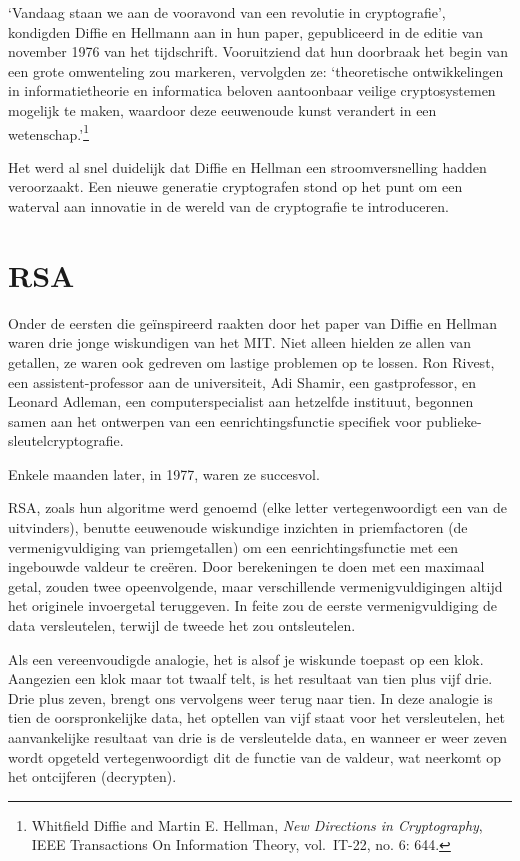 \documentclass[
  a5paper,
  smalldemyvopaper,11pt,twoside,onecolumn,openright,extrafontsizes,
hidelinks]{memoir}
\begin{document}
`Vandaag staan we aan de vooravond van een revolutie in cryptografie',
kondigden Diffie en Hellmann aan in hun paper, gepubliceerd in de editie
van november 1976 van het tijdschrift. Vooruitziend dat hun doorbraak
het begin van een grote omwenteling zou markeren, vervolgden ze:
`theoretische ontwikkelingen in informatietheorie en informatica beloven
aantoonbaar veilige cryptosystemen mogelijk te maken, waardoor deze
eeuwenoude kunst verandert in een wetenschap.'\footnote{\hspace{0pt}Whitfield
  Diffie and Martin E. Hellman, \emph{New Directions in Cryptography},
  IEEE Transactions On Information Theory, vol.~IT-22, no. 6: 644.}

Het werd al snel duidelijk dat Diffie en Hellman een stroomversnelling
hadden veroorzaakt. Een nieuwe generatie cryptografen stond op het punt
om een waterval aan innovatie in de wereld van de cryptografie te
introduceren.

\section{RSA}\label{rsa}

Onder de eersten die geïnspireerd raakten door het paper van Diffie en
Hellman waren drie jonge wiskundigen van het MIT. Niet alleen hielden ze
allen van getallen, ze waren ook gedreven om lastige problemen op te
lossen. Ron Rivest, een assistent-professor aan de universiteit, Adi
Shamir, een gastprofessor, en Leonard Adleman, een computerspecialist
aan hetzelfde instituut, begonnen samen aan het ontwerpen van een
eenrichtingsfunctie specifiek voor publieke-sleutelcryptografie.

Enkele maanden later, in 1977, waren ze succesvol.

RSA, zoals hun algoritme werd genoemd (elke letter vertegenwoordigt een
van de uitvinders), benutte eeuwenoude wiskundige inzichten in
priemfactoren (de vermenigvuldiging van priemgetallen) om een
eenrichtingsfunctie met een ingebouwde valdeur te creëren. Door
berekeningen te doen met een maximaal getal, zouden twee opeenvolgende,
maar verschillende vermenigvuldigingen altijd het originele invoergetal
teruggeven. In feite zou de eerste vermenigvuldiging de data
versleutelen, terwijl de tweede het zou ontsleutelen.

Als een vereenvoudigde analogie, het is alsof je wiskunde toepast op een
klok. Aangezien een klok maar tot twaalf telt, is het resultaat van tien
plus vijf drie. Drie plus zeven, brengt ons vervolgens weer terug naar
tien. In deze analogie is tien de oorspronkelijke data, het optellen van
vijf staat voor het versleutelen, het aanvankelijke resultaat van drie
is de versleutelde data, en wanneer er weer zeven wordt opgeteld
vertegenwoordigt dit de functie van de valdeur, wat neerkomt op het
ontcijferen (decrypten).
\end{document}
